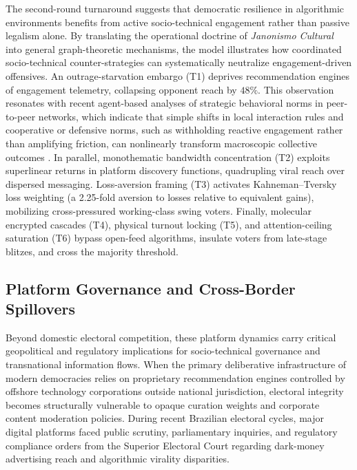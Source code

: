 \documentclass[a4paper,fleqn]{cas-dc}
\begin{document}
The second-round turnaround suggests that democratic resilience in algorithmic environments benefits from active socio-technical engagement rather than passive legalism alone. By translating the operational doctrine of \emph{Janonismo Cultural} into general graph-theoretic mechanisms, the model illustrates how coordinated socio-technical counter-strategies can systematically neutralize engagement-driven offensives. An outrage-starvation embargo (T1) deprives recommendation engines of engagement telemetry, collapsing opponent reach by $48\%$. This observation resonates with recent agent-based analyses of strategic behavioral norms in peer-to-peer networks, which indicate that simple shifts in local interaction rules and cooperative or defensive norms, such as withholding reactive engagement rather than amplifying friction, can nonlinearly transform macroscopic collective outcomes \citep{alvarenga2026power}. In parallel, monothematic bandwidth concentration (T2) exploits superlinear returns in platform discovery functions, quadrupling viral reach over dispersed messaging. Loss-aversion framing (T3) activates Kahneman--Tversky loss weighting (a 2.25-fold aversion to losses relative to equivalent gains), mobilizing cross-pressured working-class swing voters. Finally, molecular encrypted cascades (T4), physical turnout locking (T5), and attention-ceiling saturation (T6) bypass open-feed algorithms, insulate voters from late-stage blitzes, and cross the majority threshold.

\subsection{Platform Governance and Cross-Border Spillovers}
\label{subsec:platform_governance}
Beyond domestic electoral competition, these platform dynamics carry critical geopolitical and regulatory implications for socio-technical governance and transnational information flows. When the primary deliberative infrastructure of modern democracies relies on proprietary recommendation engines controlled by offshore technology corporations outside national jurisdiction, electoral integrity becomes structurally vulnerable to opaque curation weights and corporate content moderation policies. During recent Brazilian electoral cycles, major digital platforms faced public scrutiny, parliamentary inquiries, and regulatory compliance orders from the Superior Electoral Court regarding dark-money advertising reach and algorithmic virality disparities. 
\end{document}
